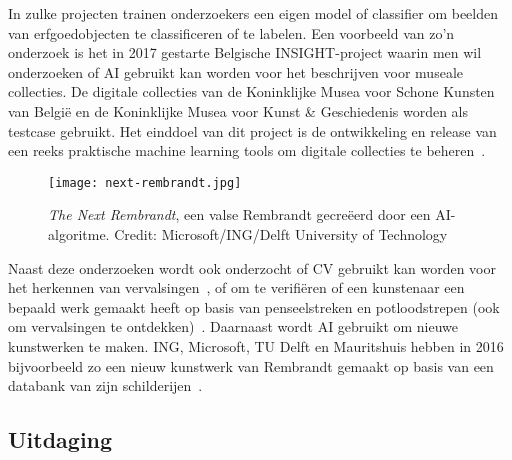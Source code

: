 
In zulke projecten trainen onderzoekers een eigen model of classifier om beelden van erfgoedobjecten te classificeren of te labelen. Een voorbeeld van zo’n onderzoek is het in 2017 gestarte Belgische INSIGHT-project waarin men wil onderzoeken of AI gebruikt kan worden voor het beschrijven voor museale collecties. De digitale collecties van de Koninklijke Musea voor Schone Kunsten van Belgi\"{e} en de Koninklijke Musea voor Kunst \& Geschiedenis worden als testcase gebruikt. Het einddoel van dit project is de ontwikkeling en release van een reeks praktische machine learning tools om digitale collecties te beheren~\autocite{UniAntwerpen2017?}.

\begin{figure}
	\centering
	\texttt{[image: next-rembrandt.jpg]}
	\caption[\textit{The Next Rembrandt}, een valse Rembrandt gecreëerd door een AI-algoritme]{\textit{The Next Rembrandt}, een valse Rembrandt gecreëerd door een AI-algoritme. Credit: Microsoft/ING/Delft University of Technology}
\end{figure}

Naast deze onderzoeken wordt ook onderzocht of CV gebruikt kan worden voor het herkennen van vervalsingen~\autocite{Dickson2018}, of om te verifi\"{e}ren of een kunstenaar een bepaald werk gemaakt heeft op basis van penseelstreken en potloodstrepen (ook om vervalsingen te ontdekken)~\autocite{Elgammal2017}. Daarnaast wordt AI gebruikt om nieuwe kunstwerken te maken\autocite{Dickson2019}. ING, Microsoft, TU Delft en Mauritshuis hebben in 2016 bijvoorbeeld zo een nieuw kunstwerk van Rembrandt gemaakt op basis van een databank van zijn schilderijen~\autocite{ING2016}.

\subsection{Uitdaging}
\label{subsec:cv-voor-ce-uitdaging}

